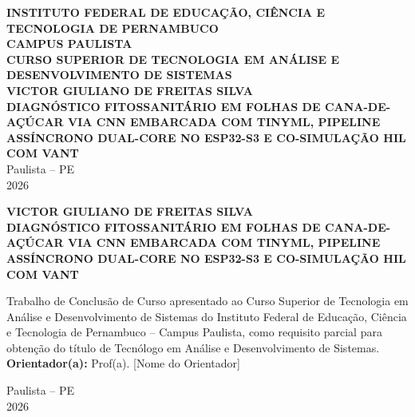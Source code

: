 \documentclass[12pt,a4paper,oneside]{report}
\begin{document}
\begin{titlepage}
    \centering
    \vspace*{0.5cm}
    {\large \textbf{INSTITUTO FEDERAL DE EDUCAÇÃO, CIÊNCIA E TECNOLOGIA DE PERNAMBUCO}}\\[0.2cm]
    {\large \textbf{CAMPUS PAULISTA}}\\[0.2cm]
    {\large \textbf{CURSO SUPERIOR DE TECNOLOGIA EM ANÁLISE E DESENVOLVIMENTO DE SISTEMAS}}\\[3.0cm]
    
    {\Large \textbf{VICTOR GIULIANO DE FREITAS SILVA}}\\[2.5cm]
    
    {\LARGE \textbf{DIAGNÓSTICO FITOSSANITÁRIO EM FOLHAS DE CANA-DE-AÇÚCAR VIA CNN EMBARCADA COM TINYML, PIPELINE ASSÍNCRONO DUAL-CORE NO ESP32-S3 E CO-SIMULAÇÃO HIL COM VANT}}\\[3.0cm]
    
    \vfill
    {\large Paulista -- PE\\2026}
\end{titlepage}

\newpage
\thispagestyle{empty}
\begin{center}
    \vspace*{0.5cm}
    {\Large \textbf{VICTOR GIULIANO DE FREITAS SILVA}}\\[3.5cm]
    
    {\LARGE \textbf{DIAGNÓSTICO FITOSSANITÁRIO EM FOLHAS DE CANA-DE-AÇÚCAR VIA CNN EMBARCADA COM TINYML, PIPELINE ASSÍNCRONO DUAL-CORE NO ESP32-S3 E CO-SIMULAÇÃO HIL COM VANT}}\\[3.0cm]
    
    \hspace{.45\textwidth}
    \begin{minipage}{.5\textwidth}
        \small
        Trabalho de Conclusão de Curso apresentado ao Curso Superior de Tecnologia em Análise e Desenvolvimento de Sistemas do Instituto Federal de Educação, Ciência e Tecnologia de Pernambuco -- Campus Paulista, como requisito parcial para obtenção do título de Tecnólogo em Análise e Desenvolvimento de Sistemas.\\[0.8cm]
        \textbf{Orientador(a):} Prof(a). [Nome do Orientador]
    \end{minipage}
    
    \vfill
    {\large Paulista -- PE\\2026}
\end{center}

\newpage
\tableofcontents
\newpage









\end{document}
